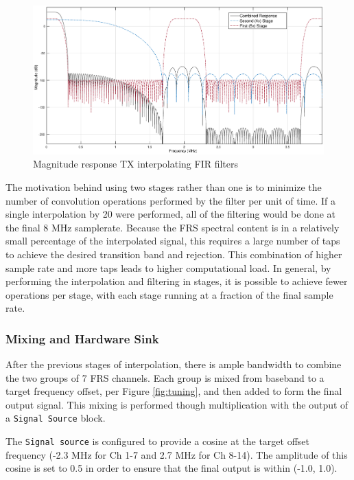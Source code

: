 \begin{figure}[h]
  \centering
  \includegraphics[width=6.5in]{images/frs/filter/tx/interp-firs.eps}
  \caption{Magnitude response TX interpolating FIR filters}
  \label{fig:tx_interp_firs}
\end{figure}

The motivation behind using two stages rather than one is to minimize the
number of convolution operations performed by the filter per unit of time.
If a single interpolation by 20 were performed, all of the filtering would
be done at the final 8 MHz samplerate. Because the \ac{FRS} spectral content is in a relatively
small percentage of the interpolated signal, this requires a large number
of taps to achieve the desired transition band and rejection. This combination
of higher sample rate and more taps leads to higher computational load.
In general, by performing the interpolation and filtering in stages, it is
possible to achieve fewer operations per stage, with each stage running at a
fraction of the final sample rate.

\subsubsection{Mixing and Hardware Sink}

After the previous stages of interpolation, there is ample bandwidth to combine
the two groups of 7 \ac{FRS} channels. Each group is mixed from baseband to
a target frequency offset, per Figure \ref{fig:tuning}, and then added to form
the final output signal. This mixing is performed though multiplication with
the output of a \texttt{Signal Source} block.

The \texttt{Signal source} is configured to provide a cosine at the target
offset frequency (-2.3 MHz for Ch 1-7 and 2.7 MHz for Ch 8-14). The amplitude
of this cosine is set to 0.5 in order to ensure that the final output is within
(-1.0, 1.0).

